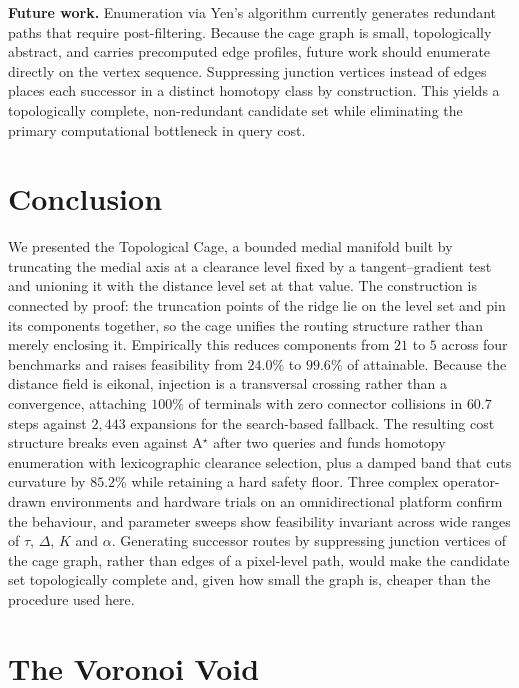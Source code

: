 \documentclass[conference]{IEEEtran}
\begin{document}
\textbf{Future work.} Enumeration via Yen's algorithm currently generates redundant paths that require post-filtering. Because the cage graph is small, topologically abstract, and carries precomputed edge profiles, future work should enumerate directly on the vertex sequence. Suppressing junction vertices instead of edges places each successor in a distinct homotopy class by construction. This yields a topologically complete, non-redundant candidate set while eliminating the primary computational bottleneck in query cost.
\section{Conclusion}

We presented the Topological Cage, a bounded medial manifold built by truncating the medial axis at a clearance level fixed by a tangent--gradient test and unioning it with the distance level set at that value. The construction is connected by proof: the truncation points of the ridge lie on the level set and pin its components together, so the cage unifies the routing structure rather than merely enclosing it. Empirically this reduces components from $21$ to $5$ across four benchmarks and raises feasibility from $24.0\%$ to $99.6\%$ of attainable. Because the distance field is eikonal, injection is a transversal crossing rather than a convergence, attaching $100\%$ of terminals with zero connector collisions in $60.7$ steps against $2{,}443$ expansions for the search-based fallback. The resulting cost structure breaks even against A$^\star$ after two queries and funds homotopy enumeration with lexicographic clearance selection, plus a damped band that cuts curvature by $85.2\%$ while retaining a hard safety floor. Three complex operator-drawn environments and hardware trials on an omnidirectional platform confirm the behaviour, and parameter sweeps show feasibility invariant across wide ranges of $\tau$, $\Delta$, $K$ and $\alpha$. Generating successor routes by suppressing junction vertices of the cage graph, rather than edges of a pixel-level path, would make the candidate set topologically complete and, given how small the graph is, cheaper than the procedure used here.

\appendices
\section{The Voronoi Void}
\label{appendix:voronoi_void}
\end{document}

